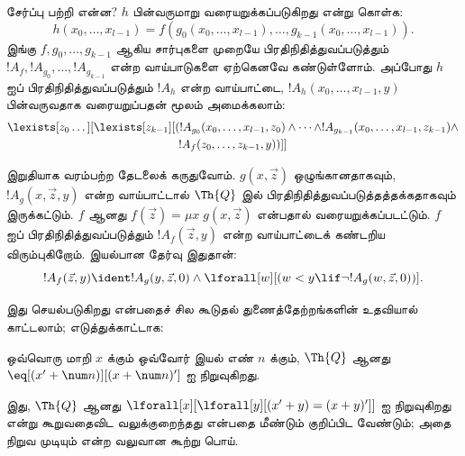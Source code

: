 \documentclass[11pt,a4paper,openany]{memoir}
\begin{document}
சேர்ப்பு பற்றி என்ன? $h$ பின்வருமாறு வரையறுக்கப்படுகிறது என்று கொள்க:
\[
h(x_0,\dots,x_{l-1}) = f(g_0(x_0,\dots,x_{l-1}), \dots,
g_{k-1}(x_0,\dots,x_{l-1})).
\]
இங்கு $f,g_0,\dots,g_{k-1}$ ஆகிய சார்புகளை முறையே
பிரதிநிதித்துவப்படுத்தும் $!A_f, !A_{g_0}, \dots,
!A_{g_{k-1}}$ என்ற வாய்பாடுகளை ஏற்கெனவே கண்டுள்ளோம். அப்போது
$h$ ஐப் பிரதிநிதித்துவப்படுத்தும் $!A_h$ என்ற வாய்பாட்டை,
$!A_h(x_0,\dots,x_{l-1},y)$ பின்வருவதாக வரையறுப்பதன் மூலம்
அமைக்கலாம்:
\begin{multline*}
  \lexists[z_0\dots][\lexists[z_{k-1}][(!A_{g_0}(x_0,\dots,x_{l-1},z_0) \land
  \dots \land !A_{g_{k-1}}(x_0,\dots,x_{l-1},z_{k-1}) \land\\
  !A_f(z_0,\dots,z_{k-1},y))]]
\end{multline*}

இறுதியாக வரம்பற்ற தேடலைக் கருதுவோம். $g(x,\vec z)$ ஒழுங்கானதாகவும்,
$!A_g(x,\vec z,y)$ என்ற வாய்பாட்டால் $\Th{Q}$ இல்
பிரதிநிதித்துவப்படுத்தத்தக்கதாகவும் இருக்கட்டும். $f$ ஆனது
$f(\vec z) = \mu x \; g(x,\vec z)$ என்பதால் வரையறுக்கப்படட்டும்.
$f$ ஐப் பிரதிநிதித்துவப்படுத்தும் $!A_f(\vec z,y)$ என்ற
வாய்பாட்டைக் கண்டறிய விரும்புகிறோம். இயல்பான தேர்வு இதுதான்:
\[
!A_f(\vec z,y) \ident !A_g(y,\vec z,0) \land \lforall[w][(w < y
\lif \lnot !A_g(w,\vec z,0))].
\]

இது செயல்படுகிறது என்பதைச் சில கூடுதல் துணைத்தேற்றங்களின் உதவியால்
காட்டலாம்; எடுத்துக்காட்டாக:

\begin{lem}
  ஒவ்வொரு மாறி $x$ க்கும் ஒவ்வோர் இயல் எண் $n$ க்கும்,
  $\Th{Q}$ ஆனது $\eq[(x'
  + \num n)][(x + \num n)']$ ஐ நிறுவுகிறது.
\end{lem}

இது, $\Th{Q}$ ஆனது
$\lforall[x][\lforall[y][(x' + y) = (x +y)']]$
ஐ நிறுவுகிறது என்று கூறுவதைவிட வலுக்குறைந்தது என்பதை மீண்டும்
குறிப்பிட வேண்டும்; அதை நிறுவ முடியும் என்ற வலுவான கூற்று பொய்.
\end{document}

